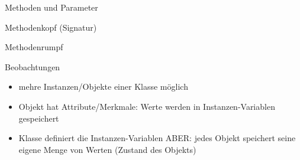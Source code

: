 \begin{frame}{Methoden und Parameter}
    \begin{block}{Methodenkopf (Signatur)}
    
    \end{block}
    \begin{block}{Methodenrumpf}
    
    \end{block}
\end{frame}

\begin{frame}{Beobachtungen}
    \begin{itemize}
    \item mehre Instanzen/Objekte  einer Klasse möglich
    \item Objekt hat Attribute/Merkmale: Werte werden in Instanzen-Variablen gespeichert
    \item Klasse definiert die Instanzen-Variablen ABER: jedes Objekt speichert seine eigene Menge von Werten (Zustand des Objekts)
    \end{itemize}
\end{frame}
